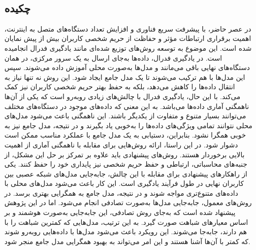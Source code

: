 
\setcounter{page}{1}
\thispagestyle{empty}

~\vfill

\subsection*{چکیده}
\begin{small}
\baselineskip=0.7cm

در عصر حاضر، با پیشرفت سریع فناوری و افزایش تعداد دستگاه‌های متصل به اینترنت، اهمیت برقراری ارتباطات مؤثر و حفاظت از حریم شخصی کاربران بیش از پیش نمایان شده است. این موضوع به توسعه روش‌های توزیع‌ شده‌ای مانند یادگیری فدرال انجامیده است. در یادگیری فدرال، داده‌ها به‌جای ارسال به یک سرور مرکزی، در همان دستگاه‌های نهایی باقی می‌مانند و مدل‌ها به‌صورت محلی آموزش داده می‌شوند. سپس این مدل‌ها با هم ترکیب می‌شوند تا یک مدل جامع ایجاد شود. این روش نه تنها نیاز به انتقال داده‌ها را کاهش می‌دهد، بلکه به حفظ بهتر حریم شخصی کاربران نیز کمک می‌کند.
با این حال، یادگیری فدرال با چالش‌های زیادی روبه‌رو است که یکی از آن‌ها ناهمگنی آماری داده‌ها می‌باشد. به این معنی که داده‌های موجود در دستگاه‌های مختلف می‌توانند بسیار متنوع و متفاوت از یکدیگر باشند. این ناهمگنی باعث می‌شود مدل‌های محلی نتوانند تمامی ویژگی‌های داده‌ها را به‌خوبی یاد بگیرند و در نتیجه، مدل جامع نیز به خوبی همگرا نشود. بنابراین، دستیابی به یک مدل جامع با عملکرد مناسب ممکن است دشوار شود. در این راستا، ارائه روش‌هایی برای مقابله با ناهمگنی آماری از اهمیت بالایی برخوردار هستند. روش‌های پیشنهادی باید علاوه بر تمرکز بر حل این مشکل، از جنبه‌های محاسباتی، ارتباطی و حفظ حریم شخصی نیز پایداری خود را حفظ کنند.
یکی از راهکارهای پیشنهادی برای مقابله با این چالش، جابه‌جایی مدل‌های شبکه عصبی بین کاربران نهایی در طول فرآیند یادگیری است. این کار باعث می‌شود مدل‌های محلی با داده‌های متنوع‌تری مواجه شوند و در نتیجه، مدل جامع به همگرایی بهتری برسد. در روش‌های معمول، جابه‌جایی مدل‌ها به‌صورت تصادفی انجام می‌شود. اما در این پژوهش پیشنهاد شده است که به‌جای روش تصادفی، این جابه‌جایی به‌صورت هوشمند و بر اساس معیارهای شباهت صورت گیرد. به این ترتیب، مدل‌هایی که کمترین شباهت را با هم دارند، جابه‌جا می‌شوند. این رویکرد باعث می‌شود مدل‌ها با داده‌هایی روبه‌رو شوند که کمتر با آن‌ها آشنا هستند و این امر می‌تواند به بهبود همگرایی مدل جامع منجر شود.

\end{small}
